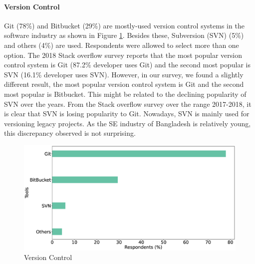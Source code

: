 \paragraph{Version Control}
Git (78\%) and Bitbucket (29\%) are mostly-used version control systems in the software industry as shown in Figure \ref{fig:versionControl}. Besides these, Subversion (SVN) (5\%) and others (4\%) are used.  Respondents were allowed to select more than one option. The 2018 Stack overflow survey\cite{StackoverflowSurvey2018} reports that the most popular version control system is Git (87.2\% developer uses Git) and the second most popular is SVN (16.1\% developer uses SVN). However, in our survey, we found a slightly different result, the most popular version control system is Git and the second most popular is Bitbucket. This might be related to the declining popularity of SVN over the years. From the Stack overflow survey over the range 2017-2018, it is clear that SVN is losing popularity to Git. Nowadays, SVN is mainly used for versioning legacy projects. As the SE industry of Bangladesh is relatively young, this discrepancy observed is not surprising.
\begin{figure}[h]
\centering
  \includegraphics[scale=0.16]{Figures/Respondents_version_control}
  \caption{Version Control}
  \label{fig:versionControl}
\end{figure}
